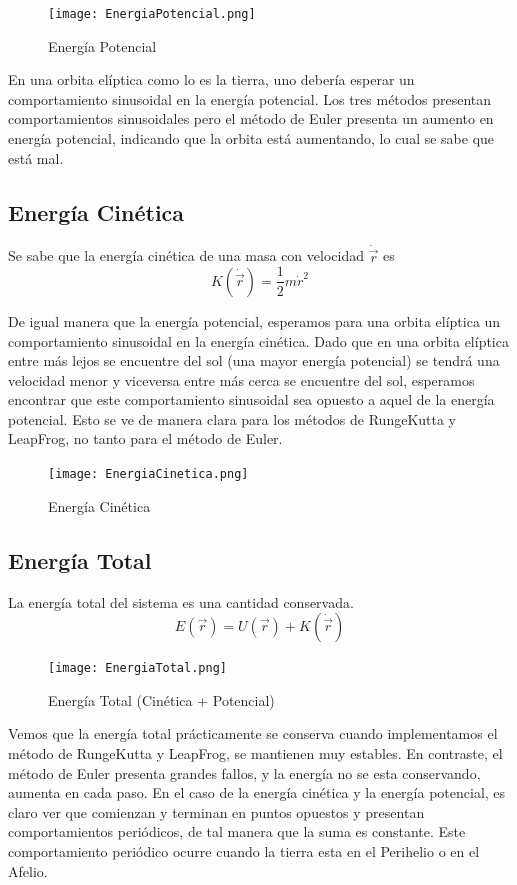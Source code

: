 \documentclass{article}
\begin{document}
\begin{figure}[!htbp]
 \centering
  \texttt{[image: EnergiaPotencial.png]}
  \caption{Energ\'ia Potencial}
\end{figure}

En una orbita el\'iptica como lo es la tierra, uno debería esperar un comportamiento sinusoidal en la energ\'ia potencial. Los tres m\'etodos presentan comportamientos sinusoidales pero el m\'etodo de Euler presenta un aumento en energ\'ia potencial, indicando que la orbita est\'a aumentando, lo cual se sabe que est\'a mal.

\subsection*{Energ\'ia Cin\'etica}

Se sabe que la energ\'ia cin\'etica de una masa con velocidad $\dot{\Vec{r}}$ es
\begin{equation*}
    K(\dot{\Vec{r}}) = \frac{1}{2}m \dot{r}^2
\end{equation*}

De igual manera que la energ\'ia potencial, esperamos para una orbita el\'iptica un comportamiento sinusoidal en la energ\'ia cin\'etica. Dado que en una orbita el\'iptica entre m\'as lejos se encuentre del sol (una mayor energ\'ia potencial) se tendr\'a una velocidad menor y viceversa entre m\'as cerca se encuentre del sol, esperamos encontrar que este comportamiento sinusoidal sea opuesto a aquel de la energ\'ia potencial. Esto se ve de manera clara para los m\'etodos de RungeKutta y LeapFrog, no tanto para el m\'etodo de Euler. 

\begin{figure}[!htbp]
 \centering
  \texttt{[image: EnergiaCinetica.png]}
  \caption{Energ\'ia Cin\'etica}
\end{figure}



\subsection*{Energ\'ia Total}


La energ\'ia total del sistema es una cantidad conservada.
\begin{equation*}
    E(\Vec{r}) = U(\Vec{r}) + K(\dot{\Vec{r}})
\end{equation*}
\begin{figure}[!htbp]
 \centering
  \texttt{[image: EnergiaTotal.png]}
  \caption{Energ\'ia Total (Cin\'etica + Potencial)}
\end{figure}

Vemos que la energ\'ia total pr\'acticamente se conserva cuando implementamos el m\'etodo de RungeKutta y LeapFrog, se mantienen muy estables. En contraste, el m\'etodo de Euler presenta grandes fallos, y la energ\'ia no se esta conservando, aumenta en cada paso. En el caso de la energ\'ia cin\'etica y la energ\'ia potencial, es claro ver que comienzan y terminan en puntos opuestos y presentan comportamientos peri\'odicos, de tal manera que la suma es constante. Este comportamiento peri\'odico ocurre cuando la tierra esta en el Perihelio o en el Afelio.
\end{document}
